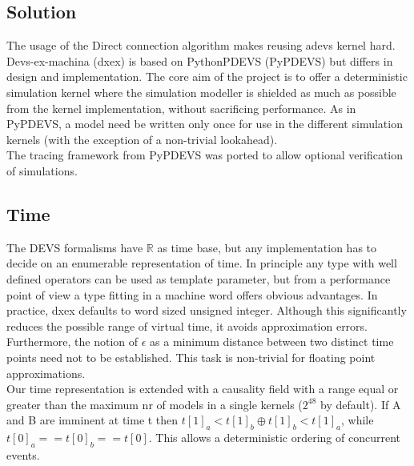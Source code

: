 \subsection{Solution} 
The usage of the Direct connection algorithm makes reusing adevs kernel hard. Devs-ex-machina (dxex) is based on PythonPDEVS \cite{PythonPDEVS}(PyPDEVS) but differs in design and implementation.
The core aim of the project is to offer a deterministic simulation kernel where the simulation modeller is shielded as much as possible from the kernel implementation, without sacrificing performance. As in PyPDEVS, a model need be written only once for use in the different simulation kernels (with the exception of a non-trivial lookahead).\\
The tracing framework from PyPDEVS was ported to allow optional verification of simulations. 
\subsection{Time}
The DEVS formalisms have $\mathbb{R}$ as time base, but any implementation has to decide on an enumerable representation of time. In principle any type with well defined operators can be used as template parameter, but from a performance point of view a type fitting in a machine word offers obvious advantages. In practice, dxex defaults to word sized unsigned integer.
Although this significantly reduces the possible range of virtual time, it avoids approximation errors. Furthermore, the notion of $\epsilon$ as a minimum distance between two distinct time points need not to be established. This task is non-trivial for floating point approximations.\\
Our time representation is extended with a causality field with a range equal or greater than the maximum nr of models in a single kernels ($2^{48}$ by default). If A and B are imminent at time t then $t[1]_a < t[1]_b \oplus t[1]_b < t[1]_a$, while $t[0]_a == t[0]_b == t[0]$. This allows a deterministic ordering of concurrent events. %
